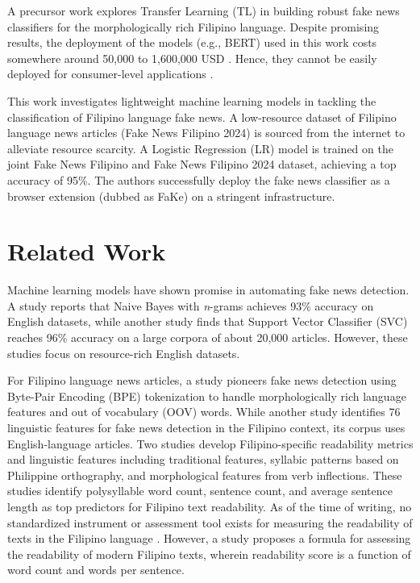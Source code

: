 \documentclass[conference]{IEEEtran}
\begin{document}
A precursor work \cite{b3} explores Transfer Learning (TL) in building robust fake news classifiers for the morphologically rich Filipino language. Despite promising results, the deployment of the models (e.g., BERT) used in this work costs somewhere around 50,000 to 1,600,000 USD \cite{b4}. Hence, they cannot be easily deployed for consumer-level applications \cite{b3, b4}.

This work investigates lightweight machine learning models in tackling the classification of Filipino language fake news. A low-resource dataset of Filipino language news articles (Fake News Filipino 2024) is sourced from the internet to alleviate resource scarcity. A Logistic Regression (LR) model is trained on the joint Fake News Filipino and Fake News Filipino 2024 dataset, achieving a top accuracy of 95\%. The authors successfully deploy the fake news classifier as a browser extension (dubbed as FaKe) on a stringent infrastructure.

\section{Related Work}

Machine learning models have shown promise in automating fake news detection. A study \cite{b5} reports that Naive Bayes with \textit{n}-grams achieves 93\% accuracy on English datasets, while another study \cite{b6} finds that Support Vector Classifier (SVC) reaches 96\% accuracy on a large corpora of about 20,000 articles. However, these studies focus on resource-rich English datasets.

For Filipino language news articles, a study \cite{b3} pioneers fake news detection using Byte-Pair Encoding (BPE) tokenization to handle morphologically rich language features and out of vocabulary (OOV) words. While another study \cite{b7} identifies 76 linguistic features for fake news detection in the Filipino context, its corpus uses English-language articles. Two studies \cite{b8, b9} develop Filipino-specific readability metrics and linguistic features including traditional features, syllabic patterns based on Philippine orthography, and morphological features from verb inflections. These studies identify polysyllable word count, sentence count, and average sentence length as top predictors for Filipino text readability. As of the time of writing, no standardized instrument or assessment tool exists for measuring the readability of texts in the Filipino language \cite{b8}. However, a study \cite{b10} proposes a formula for assessing the readability of modern Filipino texts, wherein readability score is a function of word count and words per sentence.
\end{document}
